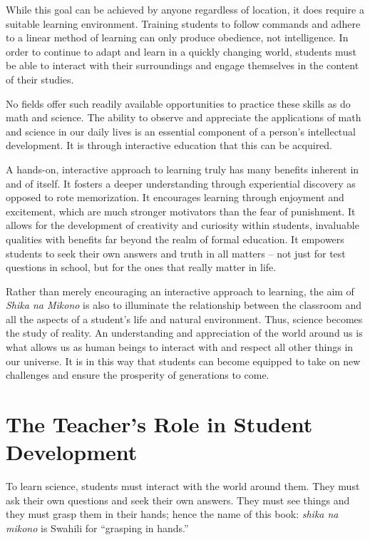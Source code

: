 While this goal can be achieved by anyone regardless of location, it does require a suitable learning environment. Training students to follow commands and adhere to a linear method of learning can only produce obedience, not intelligence. In order to continue to adapt and learn in a quickly changing world, students must be able to interact with their surroundings and engage themselves in the content of their studies.

No fields offer such readily available opportunities to practice these skills as do math and science. The ability to observe and appreciate the applications of math and science in our daily lives is an essential component of a person's intellectual development. It is through interactive education that this can be acquired.

A hands-on, interactive approach to learning truly has many benefits inherent in and of itself. It fosters a deeper understanding through experiential discovery as opposed to rote memorization. It encourages learning through enjoyment and excitement, which are much stronger motivators than the fear of punishment. It allows for the development of creativity and curiosity within students, invaluable qualities with benefits far beyond the realm of formal education. It empowers students to seek their own answers and truth in all matters -- not just for test questions in school, but for the ones that really matter in life.

Rather than merely encouraging an interactive approach to learning, the aim of \emph{Shika na Mikono} is also to illuminate the relationship between the classroom and all the aspects of a student's life and natural environment. Thus, science becomes the study of reality. An understanding and appreciation of the world around us is what allows us as human beings to interact with and respect all other things in our universe. It is in this way that students can become equipped to take on new challenges and ensure the prosperity of generations to come.

\vfill
\pagebreak

\section*{The Teacher's Role in Student Development}

To learn science, students must interact with the world around them. They must ask their own questions and seek their own answers. They must see things and they must grasp them in their hands; hence the name of this book: \textit{shika na mikono} is Swahili for ``grasping in hands.''


